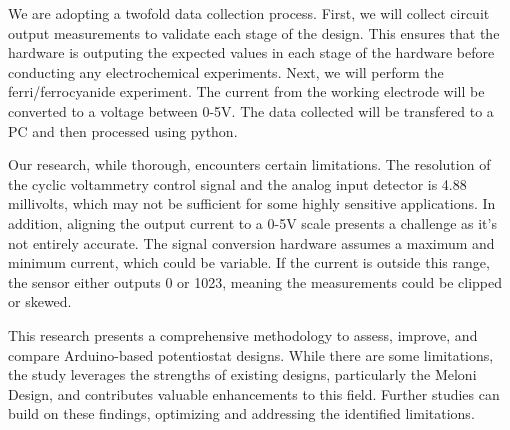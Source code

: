 \documentclass{article}
\begin{document}
We are adopting a twofold data collection process. First, we will collect circuit output measurements to validate each stage of the design. This ensures that the hardware is outputing the expected values in each stage of the hardware before conducting any electrochemical experiments. Next, we will perform the ferri/ferrocyanide experiment. The current from the working electrode will be converted to a voltage between 0-5V. The data collected will be transfered to a PC and then processed using python.

Our research, while thorough, encounters certain limitations. The resolution of the cyclic voltammetry control signal and the analog input detector is 4.88 millivolts, which may not be sufficient for some highly sensitive applications. In addition, aligning the output current to a 0-5V scale presents a challenge as it's not entirely accurate. The signal conversion hardware assumes a maximum and minimum current, which could be variable. If the current is outside this range, the sensor either outputs 0 or 1023, meaning the measurements could be clipped or skewed.

This research presents a comprehensive methodology to assess, improve, and compare Arduino-based potentiostat designs. While there are some limitations, the study leverages the strengths of existing designs, particularly the Meloni Design, and contributes valuable enhancements to this field. Further studies can build on these findings, optimizing and addressing the identified limitations.
\end{document}
